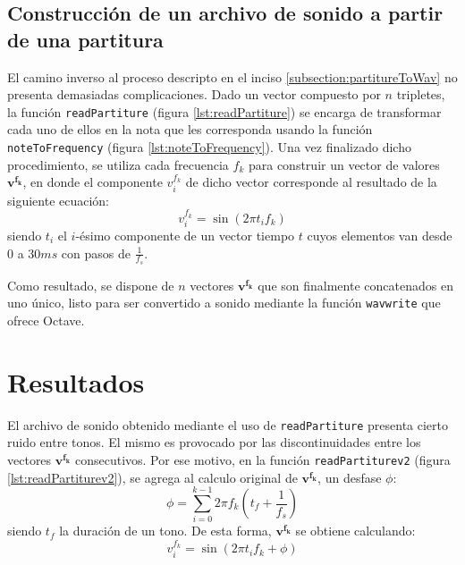 \documentclass[journal, monochrome]{IEEEtran}
\begin{document}
\subsection{Construcción de un archivo de sonido a partir de una partitura}
El camino inverso al proceso descripto en el inciso \ref{subsection:partitureToWav} no presenta demasiadas complicaciones. Dado un vector
compuesto por $n$ tripletes, la función \texttt{readPartiture} (figura \ref{lst:readPartiture}) se encarga de transformar cada uno de ellos en la nota que les corresponda usando la función \texttt{noteToFrequency} (figura \ref{lst:noteToFrequency}).
Una vez finalizado dicho procedimiento, se utiliza cada frecuencia $f_k$ para construir un vector de valores $\mathbf{v^{f_k}}$, en donde el componente $v^{f_k}_i$ de dicho vector corresponde al resultado de la siguiente ecuación:
\begin{equation}
v^{f_k}_i = \sin(2\pi t_i f_k)
\end{equation}
siendo $t_i$ el $i$-ésimo componente de un vector tiempo $t$ cuyos elementos van desde $0$ a $30 ms$ con pasos de $\tfrac{1}{f_s}$.

Como resultado, se dispone de $n$ vectores $\mathbf{v^{f_k}}$ que son finalmente concatenados en uno único, listo para
ser convertido a sonido mediante la función \texttt{wavwrite} que ofrece Octave.



\vspace{1cm}
\section{Resultados}
\label{section:results}
\vspace{0.5cm}

El archivo de sonido obtenido mediante el uso de \texttt{readPartiture} presenta cierto ruido entre tonos. El mismo es provocado por las discontinuidades entre los vectores $\mathbf{v^{f_k}}$ consecutivos. Por ese motivo, en la función \texttt{readPartiturev2} (figura \ref{lst:readPartiturev2}), se agrega al calculo original de $\mathbf{v^{f_k}}$, un desfase $\phi$: \\
\begin{equation}
\phi = \sum_{i=0}^{k-1} 2\pi f_{k}(t_{f}+\frac{1}{f_{s}})
\end{equation}
siendo $t_{f}$ la duración de un tono. De esta forma, $\mathbf{v^{f_k}}$ se obtiene calculando:
\begin{equation}
v^{f_k}_i = \sin(2\pi t_i f_k + \phi)
\end{equation}
\end{document}
